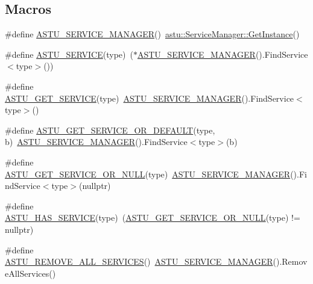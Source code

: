 \subsection*{Macros}
\begin{DoxyCompactItemize}
\item 
\#define \hyperlink{group__srv__group_ga5216c57cf872d6a0c05d0e6f33c66fc7}{A\+S\+T\+U\+\_\+\+S\+E\+R\+V\+I\+C\+E\+\_\+\+M\+A\+N\+A\+G\+ER}()~\hyperlink{classastu_1_1ServiceManager_a26941fe98ea3f2792deca62e4124bf15}{astu\+::\+Service\+Manager\+::\+Get\+Instance}()
\item 
\#define \hyperlink{group__srv__group_ga42575546f01bf92989d08916564ffc66}{A\+S\+T\+U\+\_\+\+S\+E\+R\+V\+I\+CE}(type)~($\ast$\hyperlink{group__srv__group_ga5216c57cf872d6a0c05d0e6f33c66fc7}{A\+S\+T\+U\+\_\+\+S\+E\+R\+V\+I\+C\+E\+\_\+\+M\+A\+N\+A\+G\+ER}().Find\+Service$<$type$>$())
\item 
\#define \hyperlink{group__srv__group_ga42e4ee34b527cd82ba6c0013b5d1441e}{A\+S\+T\+U\+\_\+\+G\+E\+T\+\_\+\+S\+E\+R\+V\+I\+CE}(type)~\hyperlink{group__srv__group_ga5216c57cf872d6a0c05d0e6f33c66fc7}{A\+S\+T\+U\+\_\+\+S\+E\+R\+V\+I\+C\+E\+\_\+\+M\+A\+N\+A\+G\+ER}().Find\+Service$<$type$>$()
\item 
\#define \hyperlink{group__srv__group_gadd58983b12766275d79b748307fcd637}{A\+S\+T\+U\+\_\+\+G\+E\+T\+\_\+\+S\+E\+R\+V\+I\+C\+E\+\_\+\+O\+R\+\_\+\+D\+E\+F\+A\+U\+LT}(type,  b)~\hyperlink{group__srv__group_ga5216c57cf872d6a0c05d0e6f33c66fc7}{A\+S\+T\+U\+\_\+\+S\+E\+R\+V\+I\+C\+E\+\_\+\+M\+A\+N\+A\+G\+ER}().Find\+Service$<$type$>$(b)
\item 
\#define \hyperlink{group__srv__group_ga223765690bb6ade99e1e5f954f096cfb}{A\+S\+T\+U\+\_\+\+G\+E\+T\+\_\+\+S\+E\+R\+V\+I\+C\+E\+\_\+\+O\+R\+\_\+\+N\+U\+LL}(type)~\hyperlink{group__srv__group_ga5216c57cf872d6a0c05d0e6f33c66fc7}{A\+S\+T\+U\+\_\+\+S\+E\+R\+V\+I\+C\+E\+\_\+\+M\+A\+N\+A\+G\+ER}().Find\+Service$<$type$>$(nullptr)
\item 
\#define \hyperlink{group__srv__group_ga8b3cd4edfd24593b12bc662acf62e9a1}{A\+S\+T\+U\+\_\+\+H\+A\+S\+\_\+\+S\+E\+R\+V\+I\+CE}(type)~(\hyperlink{group__srv__group_ga223765690bb6ade99e1e5f954f096cfb}{A\+S\+T\+U\+\_\+\+G\+E\+T\+\_\+\+S\+E\+R\+V\+I\+C\+E\+\_\+\+O\+R\+\_\+\+N\+U\+LL}(type) != nullptr)
\item 
\#define \hyperlink{group__srv__group_ga640af14a801ce66a6286ca8bc4862473}{A\+S\+T\+U\+\_\+\+R\+E\+M\+O\+V\+E\+\_\+\+A\+L\+L\+\_\+\+S\+E\+R\+V\+I\+C\+ES}()~\hyperlink{group__srv__group_ga5216c57cf872d6a0c05d0e6f33c66fc7}{A\+S\+T\+U\+\_\+\+S\+E\+R\+V\+I\+C\+E\+\_\+\+M\+A\+N\+A\+G\+ER}().Remove\+All\+Services()

\end{DoxyCompactItemize}
